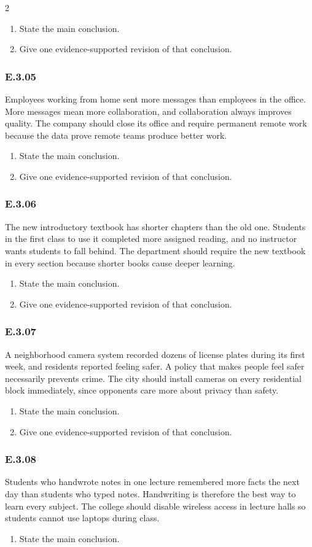 \documentclass[10pt]{extarticle}
\newcommand{\bankitem}[1]{\subsubsection*{#1}}
\begin{document}
\begin{multicols}{2}
\begin{enumerate}[label=(\alph*)]
  \item State the main conclusion.
  \item Give one evidence-supported revision of that conclusion.
\end{enumerate}
\bankitem{E.3.05}
Employees working from home sent more messages than employees in the office. More messages mean more collaboration, and collaboration always improves quality. The company should close its office and require permanent remote work because the data prove remote teams produce better work.
\begin{enumerate}[label=(\alph*)]
  \item State the main conclusion.
  \item Give one evidence-supported revision of that conclusion.
\end{enumerate}
\bankitem{E.3.06}
The new introductory textbook has shorter chapters than the old one. Students in the first class to use it completed more assigned reading, and no instructor wants students to fall behind. The department should require the new textbook in every section because shorter books cause deeper learning.
\begin{enumerate}[label=(\alph*)]
  \item State the main conclusion.
  \item Give one evidence-supported revision of that conclusion.
\end{enumerate}
\bankitem{E.3.07}
A neighborhood camera system recorded dozens of license plates during its first week, and residents reported feeling safer. A policy that makes people feel safer necessarily prevents crime. The city should install cameras on every residential block immediately, since opponents care more about privacy than safety.
\begin{enumerate}[label=(\alph*)]
  \item State the main conclusion.
  \item Give one evidence-supported revision of that conclusion.
\end{enumerate}
\bankitem{E.3.08}
Students who handwrote notes in one lecture remembered more facts the next day than students who typed notes. Handwriting is therefore the best way to learn every subject. The college should disable wireless access in lecture halls so students cannot use laptops during class.
\begin{enumerate}[label=(\alph*)]
  \item State the main conclusion.

\end{enumerate}
\end{multicols}
\end{document}
